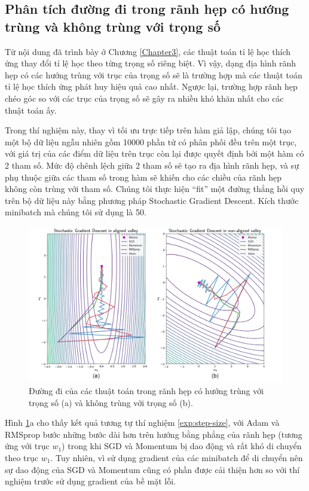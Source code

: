 \subsection{Phân tích đường đi trong rãnh hẹp có hướng trùng và không trùng với trọng số}
\label{exp:aligned-nonaligned}

Từ nội dung đã trình bày ở Chương \ref{Chapter3}, các thuật toán tỉ lệ học thích ứng thay đổi tỉ lệ học theo từng trọng số riêng biệt. Vì vậy, dạng địa hình rãnh hẹp có các hướng trùng với trục của trọng số sẽ là trường hợp mà các thuật toán tỉ lệ học thích ứng phát huy hiệu quả cao nhất. Ngược lại, trường hợp rãnh hẹp chéo góc so với các trục của trọng số sẽ gây ra nhiều khó khăn nhất cho các thuật toán ấy.

Trong thí nghiệm này, thay vì tối ưu trực tiếp trên hàm giả lập, chúng tôi tạo một bộ dữ liệu ngẫu nhiên gồm 10000 phần tử có phân phối đều trên một trục, với giá trị của các điểm dữ liệu trên trục còn lại được quyết định bởi một hàm có 2 tham số. Mức độ chênh lệch giữa 2 tham số sẽ tạo ra địa hình rãnh hẹp, và sự phụ thuộc giữa các tham số trong hàm sẽ khiến cho các chiều của rãnh hẹp không còn trùng với tham số. Chúng tôi thực hiện ``fit'' một đường thẳng hồi quy trên bộ dữ liệu này bằng phương pháp Stochastic Gradient Descent. Kích thước minibatch mà chúng tôi sử dụng là 50.

\begin{figure}[htp]
	\centering
	\includegraphics[width=140 mm]{images/aligned-nonaligned.png}
	\caption{Đường đi của các thuật toán trong rãnh hẹp có hướng trùng với trọng số (a) và không trùng với trọng số (b).}
	\label{fig:aligned-nonaligned}
\end{figure}

Hình \ref{fig:aligned-nonaligned}a cho thấy kết quả tương tự thí nghiệm \ref{exp:step-size}, với Adam và RMSprop bước những bước dài hơn trên hướng bằng phẳng của rãnh hẹp (tương ứng với trục $w_1$) trong khi SGD và Momentum bị dao động và rất khó di chuyển theo trục $w_1$. Tuy nhiên, vì sử dụng gradient của các minibatch để di chuyển nên sự dao động của SGD và Momentum cũng có phần được cải thiện hơn so với thí nghiệm trước sử dụng gradient của bề mặt lỗi.

